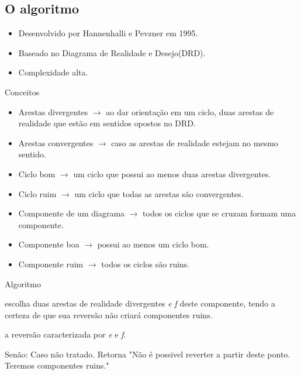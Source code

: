 \documentclass{beamer}
\begin{document}
\subsection{O algoritmo}

\begin{frame}
	\begin{itemize}
		\item Desenvolvido por Hannenhalli e Pevzner em 1995.
		\item Baseado no Diagrama de Realidade e Desejo(DRD).
 		\item Complexidade alta.
	\end{itemize}
\end{frame}

\begin{frame}{Conceitos}
	\begin{itemize}
		\item Arestas divergentes $\to$ ao dar orientação em um ciclo, duas arestas de realidade que estão em sentidos opostos no DRD.
		\pause \item Arestas convergentes $\to$ caso as arestas de realidade estejam no mesmo sentido.
		\pause \item Ciclo bom $\to$ um ciclo que possui ao menos duas arestas divergentes.
		\pause \item Ciclo ruim $\to$ um ciclo que todas as arestas são convergentes.
		\pause \item Componente de um diagrama $\to$ todos os ciclos que se cruzam formam uma componente.
		\pause \item Componente boa $\to$ possui ao menos um ciclo bom.
		\pause \item Componente ruim $\to$ todos os ciclos são ruins.
	\end{itemize}
\end{frame}

\begin{frame}
	\begin{block} {Algoritmo}
		\begin{algorithm}[H]
		
			 {
				escolha duas arestas de realidade divergentes \emph{e} \emph{f} deste componente, tendo a certeza de que sua reversão não criará componentes ruins.
				
				\Return a reversão caracterizada por \emph{e} e \emph{f}.
			}
			Senão: Caso não tratado. Retorna "Não é possivel reverter a partir deste ponto. Teremos componentes ruins."
		\end{algorithm}
	\end{block}
\end{frame}
\end{document}
